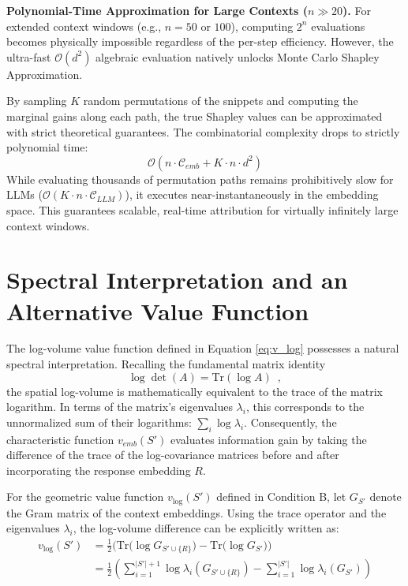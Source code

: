 \documentclass{article}
\begin{document}
\textbf{Polynomial-Time Approximation for Large Contexts ($n \gg 20$).} 
For extended context windows (e.g., $n = 50$ or $100$), computing $2^n$ evaluations becomes physically impossible regardless of the per-step efficiency. However, the ultra-fast $\mathcal{O}(d^2)$ algebraic evaluation natively unlocks Monte Carlo Shapley Approximation. 

By sampling $K$ random permutations of the snippets and computing the marginal gains along each path, the true Shapley values can be approximated with strict theoretical guarantees. The combinatorial complexity drops to strictly polynomial time:
$$ \mathcal{O}(n \cdot \mathcal{C}_{emb} + K \cdot n \cdot d^2) $$
While evaluating thousands of permutation paths remains prohibitively slow for LLMs ($\mathcal{O}(K \cdot n \cdot \mathcal{C}_{LLM})$), it executes near-instantaneously in the embedding space. This guarantees scalable, real-time attribution for virtually infinitely large context windows.

\section{Spectral Interpretation and an Alternative Value Function}

The log-volume value function defined in Equation \eqref{eq:v_log} possesses a natural spectral interpretation. Recalling the fundamental matrix identity $$\log\det(A) = \text{Tr}(\log A)\enspace ,$$ 
the spatial log-volume is mathematically equivalent to the trace of the matrix logarithm. In terms of the matrix's eigenvalues $\lambda_i$, this corresponds to the unnormalized sum of their logarithms: $\sum_i \log \lambda_i$. Consequently, the characteristic function $v_{emb}(S')$ evaluates information gain by taking the difference of the trace of the log-covariance matrices before and after incorporating the response embedding $R$.

For the geometric value function $v_{\log}(S')$ defined in Condition B, let $G_{S'}$ denote the Gram matrix of the context embeddings. Using the trace operator and the eigenvalues $\lambda_i$, the log-volume difference can be explicitly written as:
\begin{align} \label{eq:v_log_trace}
v_{\log}(S') &= \frac{1}{2} \Big( \text{Tr}\big(\log G_{S' \cup \{R\}}\big) - \text{Tr}\big(\log G_{S'}\big) \Big) \nonumber \\
&= \frac{1}{2} \left( \sum_{i=1}^{\vert S' \vert + 1} \log \lambda_i(G_{S' \cup \{R\}}) - \sum_{i=1}^{\vert S' \vert} \log \lambda_i(G_{S'}) \right)
\end{align}
\end{document}
